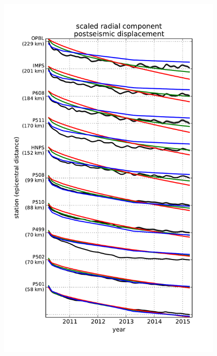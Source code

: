 \documentclass[12pt]{article}
\begin{document}
\begin{figure}
\includegraphics[scale=0.9]{Figures/near_field_final_record_section}
\centering 
\caption{}
\label{ShearRatio}
\end{figure} 
\end{document}
